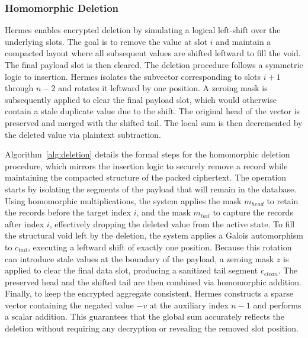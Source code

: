 \documentclass[sigconf,nonacm]{acmart}
\begin{document}
\subsubsection{Homomorphic Deletion}

Hermes enables encrypted deletion by simulating a logical left-shift over the underlying slots. The goal is to remove the value at slot $i$ and maintain a compacted layout where all subsequent values are shifted leftward to fill the void. The final payload slot is then cleared.
The deletion procedure follows a symmetric logic to insertion. Hermes isolates the subvector corresponding to slots $i+1$ through $n-2$ and rotates it leftward by one position. A zeroing mask is subsequently applied to clear the final payload slot, which would otherwise contain a stale duplicate value due to the shift. The original head of the vector is preserved and merged with the shifted tail. The local sum is then decremented by the deleted value via plaintext subtraction.

Algorithm~\ref{alg:deletion} details the formal steps for the homomorphic deletion procedure, which mirrors the insertion logic to securely remove a record while maintaining the compacted structure of the packed ciphertext. The operation starts by isolating the segments of the payload that will remain in the database. Using homomorphic multiplications, the system applies the mask $m_{head}$ to retain the records before the target index $i$, and the mask $m_{tail}$ to capture the records after index $i$, effectively dropping the deleted value from the active state. To fill the structural void left by the deletion, the system applies a Galois automorphism to $c_{tail}$, executing a leftward shift of exactly one position. Because this rotation can introduce stale values at the boundary of the payload, a zeroing mask $z$ is applied to clear the final data slot, producing a sanitized tail segment $c_{clean}$. The preserved head and the shifted tail are then combined via homomorphic addition. Finally, to keep the encrypted aggregate consistent, Hermes constructs a sparse vector containing the negated value $-v$ at the auxiliary index $n-1$ and performs a scalar addition. This guarantees that the global sum accurately reflects the deletion without requiring any decryption or revealing the removed slot position.
\end{document}
